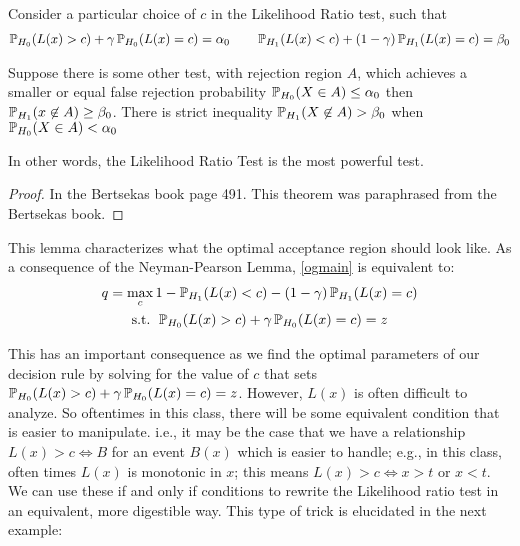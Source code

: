 \documentclass{article}
\newcommand\TODO[1]{\textcolor{red}{[TODO]#1}}
\begin{document}
\begin{lemma}
Consider a particular choice of $c$ in the Likelihood Ratio test, such that
\begin{align*}
\operatorname{\mathbb{P}}_{H_0}(L(x) > c) + \gamma \operatorname{\mathbb{P}}_{H_0}(L(x) = c) = \alpha_0 \qquad \operatorname{\mathbb{P}}_{H_1}(L(x) < c) +  (1-\gamma) \operatorname{\mathbb{P}}_{H_1}(L(x) = c) = \beta_0
\end{align*}

Suppose there is some other test, with rejection region $A$, which achieves a smaller or equal false rejection probability $\operatorname{\mathbb{P}}_{H_0}(X \in A) \leq \alpha_0$ then $\operatorname{\mathbb{P}}_{H_1}(x \not\in A) \geq \beta_0$. There is strict inequality $\operatorname{\mathbb{P}}_{H_1}(X \not\in A) > \beta_0$ when $\operatorname{\mathbb{P}}_{H_0}(X \in A) < \alpha_0$ 

In other words, the Likelihood Ratio Test is the most powerful test.
\end{lemma}
\begin{proof}
In the Bertsekas book page 491. This theorem was paraphrased from the Bertsekas book.
\end{proof}

This lemma characterizes what the optimal acceptance region should look like. As a consequence of the Neyman-Pearson Lemma, \eqref{ogmain} is equivalent to: 
\begin{gather}
q = \max_{c} 1 - \operatorname{\mathbb{P}}_{H_1}(L(x) < c) -  (1-\gamma) \operatorname{\mathbb{P}}_{H_1}(L(x) = c) \label{main}\\
\text{s.t. } \operatorname{\mathbb{P}}_{H_0}(L(x) > c) + \gamma \operatorname{\mathbb{P}}_{H_0}(L(x) = c) = z \nonumber
\end{gather}

This has an important consequence as we find the optimal parameters of our decision rule by solving for the value of $c$ that sets $\operatorname{\mathbb{P}}_{H_0}(L(x) > c) + \gamma \operatorname{\mathbb{P}}_{H_0}(L(x) = c) = z$. However, $L(x)$ is often difficult to analyze. So oftentimes in this class, there will be some equivalent condition that is easier to manipulate. i.e., it may be the case that we have a relationship $L(x) > c \iff B$ for an event $B(x)$ which is easier to handle; e.g., in this class, often times $L(x)$ is monotonic in $x$; this means $L(x) > c \iff x > t \text{ or }x < t$. We can use these if and only if conditions to rewrite the Likelihood ratio test in an equivalent, more digestible way. This type of trick is elucidated in the next example: 



\end{document}
